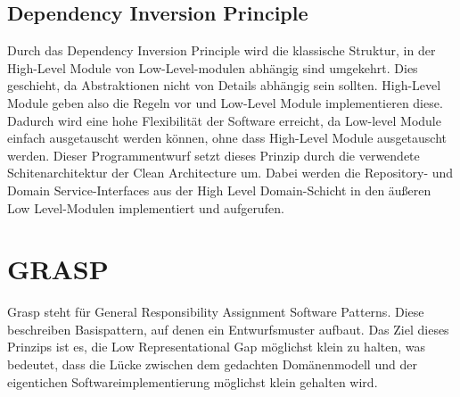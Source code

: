 \subsection{Dependency Inversion Principle}
Durch das Dependency Inversion Principle wird die klassische Struktur, in der High-Level Module von Low-Level-modulen abhängig sind umgekehrt. Dies geschieht, da Abstraktionen nicht von Details abhängig sein sollten. High-Level Module  
geben also die Regeln vor und Low-Level Module implementieren diese. Dadurch wird eine hohe Flexibilität der Software erreicht, da Low-level Module einfach ausgetauscht werden können, ohne dass High-Level Module ausgetauscht werden.
\newline Dieser Programmentwurf setzt dieses Prinzip durch die verwendete Schitenarchitektur der Clean Architecture um. Dabei werden die Repository- und Domain Service-Interfaces aus der High Level Domain-Schicht in den äußeren Low Level-Modulen implementiert und aufgerufen. 

\section{GRASP}
Grasp steht für General Responsibility Assignment Software Patterns. Diese beschreiben Basispattern, auf denen ein Entwurfsmuster aufbaut. Das Ziel dieses Prinzips ist es, die Low Representational Gap möglichst klein zu halten, was bedeutet, dass die Lücke zwischen dem 
gedachten Domänenmodell und der eigentichen Softwareimplementierung möglichst klein gehalten wird.
